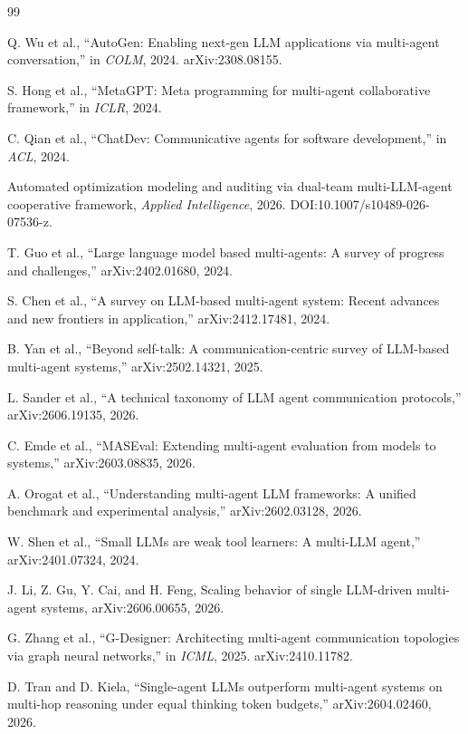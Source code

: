 \documentclass[11pt]{article}
\begin{document}
\begin{thebibliography}{99}

 Q. Wu et al., ``AutoGen: Enabling next-gen LLM applications via multi-agent conversation,'' in \emph{COLM}, 2024. arXiv:2308.08155.

 S. Hong et al., ``MetaGPT: Meta programming for multi-agent collaborative framework,'' in \emph{ICLR}, 2024.

 C. Qian et al., ``ChatDev: Communicative agents for software development,'' in \emph{ACL}, 2024.

 Automated optimization modeling and auditing via dual-team multi-LLM-agent cooperative framework, \emph{Applied Intelligence}, 2026. DOI:10.1007/s10489-026-07536-z.

 T. Guo et al., ``Large language model based multi-agents: A survey of progress and challenges,'' arXiv:2402.01680, 2024.

 S. Chen et al., ``A survey on LLM-based multi-agent system: Recent advances and new frontiers in application,'' arXiv:2412.17481, 2024.

 B. Yan et al., ``Beyond self-talk: A communication-centric survey of LLM-based multi-agent systems,'' arXiv:2502.14321, 2025.

 L. Sander et al., ``A technical taxonomy of LLM agent communication protocols,'' arXiv:2606.19135, 2026.

 C. Emde et al., ``MASEval: Extending multi-agent evaluation from models to systems,'' arXiv:2603.08835, 2026.

 A. Orogat et al., ``Understanding multi-agent LLM frameworks: A unified benchmark and experimental analysis,'' arXiv:2602.03128, 2026.

 W. Shen et al., ``Small LLMs are weak tool learners: A multi-LLM agent,'' arXiv:2401.07324, 2024.

 J. Li, Z. Gu, Y. Cai, and H. Feng, Scaling behavior of single LLM-driven multi-agent systems, arXiv:2606.00655, 2026.

 G. Zhang et al., ``G-Designer: Architecting multi-agent communication topologies via graph neural networks,'' in \emph{ICML}, 2025. arXiv:2410.11782.

 D. Tran and D. Kiela, ``Single-agent LLMs outperform multi-agent systems on multi-hop reasoning under equal thinking token budgets,'' arXiv:2604.02460, 2026.


\end{thebibliography}
\end{document}
